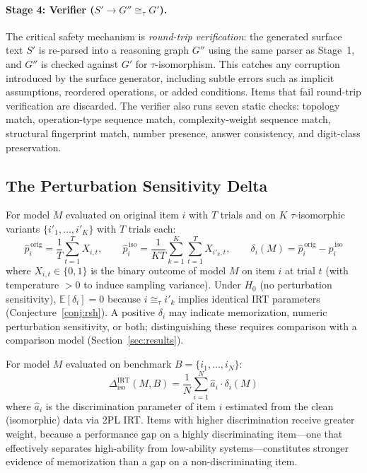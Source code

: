 \paragraph{Stage 4: Verifier ($S' \to G'' \cong_\tau G'$).}
The critical safety mechanism is \emph{round-trip verification}: the
generated surface text $S'$ is re-parsed into a reasoning graph $G''$
using the same parser as Stage~1, and $G''$ is checked against $G'$ for
$\tau$-isomorphism. This catches any corruption introduced by the
surface generator, including subtle errors such as implicit assumptions,
reordered operations, or added conditions. Items that fail round-trip
verification are discarded. The verifier also runs seven static checks:
topology match, operation-type sequence match, complexity-weight
sequence match, structural fingerprint match, number presence, answer
consistency, and digit-class preservation.


\subsection{The Perturbation Sensitivity Delta}
\label{sec:delta}

\begin{definition}
\label{def:item_delta}
For model $M$ evaluated on original item $i$ with $T$ trials and on $K$
$\tau$-isomorphic variants $\{i'_1, \ldots, i'_K\}$ with $T$ trials
each:
\begin{equation}
\hat{p}_i^{\,\mathrm{orig}} = \frac{1}{T} \sum_{t=1}^{T} X_{i,t},
\qquad
\hat{p}_i^{\,\mathrm{iso}} = \frac{1}{KT} \sum_{k=1}^{K}
\sum_{t=1}^{T} X_{i'_k, t},
\qquad
\delta_i(M) = \hat{p}_i^{\,\mathrm{orig}} -
\hat{p}_i^{\,\mathrm{iso}}
\label{eq:item_delta}
\end{equation}
where $X_{i,t} \in \{0,1\}$ is the binary outcome of model $M$ on item
$i$ at trial $t$ (with temperature $> 0$ to induce sampling variance).
Under $H_0$ (no perturbation sensitivity), $\mathbb{E}[\delta_i] = 0$ because
$i \cong_\tau i'_k$ implies identical IRT parameters (Conjecture~\ref{conj:rsh}).
A positive $\delta_i$ may indicate memorization, numeric perturbation
sensitivity, or both; distinguishing these requires comparison with a
comparison model (Section~\ref{sec:results}).
\end{definition}

\begin{definition}
\label{def:model_delta}
For model $M$ evaluated on benchmark $B = \{i_1, \ldots, i_N\}$:
\begin{equation}
\Delta_{\mathrm{iso}}^{\mathrm{IRT}}(M, B) = \frac{1}{N}
\sum_{i=1}^{N} \hat{a}_i \cdot \delta_i(M)
\label{eq:delta_irt}
\end{equation}
where $\hat{a}_i$ is the discrimination parameter of item $i$ estimated
from the clean (isomorphic) data via 2PL IRT. Items with higher
discrimination receive greater weight, because a performance gap on a
highly discriminating item---one that effectively separates high-ability
from low-ability systems---constitutes stronger evidence of memorization
than a gap on a non-discriminating item.
\end{definition}

